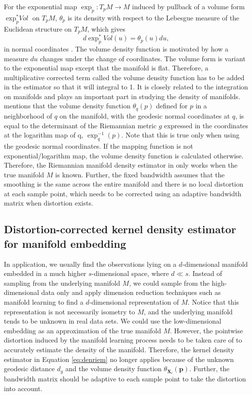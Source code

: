 \documentclass[11pt,a4paper,]{article}
\begin{document}
For the exponential map \(\exp_p: T_pM \rightarrow M\) induced by pullback of a volume form \(\exp_p^*\textit{Vol}\) on \(T_pM\), \(\theta_p\) is its density with respect to the Lebesgue measure of the Euclidean structure on \(T_pM\), which gives
\[
d\exp_p^*\textit{Vo}l(u) = \theta_p(u)du,
\]
in normal coordinates \autocite{Le_Brigant2019-lj}. The volume density function is motivated by how a measure \(du\) changes under the change of coordinates. The volume form is variant to the exponential map except that the manifold is flat. Therefore, a multiplicative corrected term called the volume density function has to be added in the estimator so that it will integral to 1. It is closely related to the integration on manifolds and plays an important part in studying the density of manifolds.
\textcite{Pelletier2005-vu} mentions that the volume density function \(\theta_q(p)\) defined for \(p\) in a neighborhood of \(q\) on the manifold, with the geodesic normal coordinates at \(q\), is equal to the determinant of the Riemannian metric \(g\) expressed in the coordinates at the logarithm map of q, \(\exp_q^{-1}(p)\).
Note that this is true only when using the geodesic normal coordinates. If the mapping function is not exponential/logarithm map, the volume density function is calculated otherwise. Therefore, the Riemannian manifold density estimator in \textcite{Pelletier2005-vu} only works when the true manifold \(M\) is known.
Further, the fixed bandwidth assumes that the smoothing is the same across the entire manifold and there is no local distortion at each sample point, which needs to be corrected using an adaptive bandwidth matrix when distortion exists.

\hypertarget{dckde}{%
\subsection{Distortion-corrected kernel density estimator for manifold embedding}\label{dckde}}

In application, we usually find the observations lying on a \(d\)-dimensional manifold embedded in a much higher \(s\)-dimensional space, where \(d \ll s\). Instead of sampling from the underlying manifold \(M\), we could sample from the high-dimensional data only and apply dimension reduction techniques such as manifold learning to find a \(d\)-dimensional representation of \(M\).
Notice that this representation is not necessarily isometry to \(M\), and the underlying manifold tends to be unknown in real data sets. We could use the low-dimensional embedding as an approximation of the true manifold \(M\). However, the pointwise distortion induced by the manifold learning process needs to be taken care of to accurately estimate the density of the manifold. Therefore, the kernel density estimator in Equation \eqref{eq:denriem} no longer applies because of the unknown geodesic distance \(d_g\) and the volume density function \(\theta_{\pmb{X}_i}(\pmb{p})\).
Further, the bandwidth matrix should be adaptive to each sample point to take the distortion into account.
\end{document}
